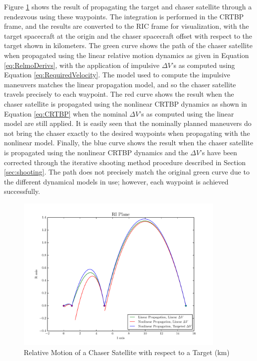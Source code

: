 \documentclass[a4paper]{article}
\begin{document}
Figure \ref{fig:RIC_1} shows the result of propagating the target and chaser satellite through a rendezvous using these waypoints.  The integration is performed in the CRTBP frame, and the results are converted to the RIC frame for visualization, with the target spacecraft at the origin and the chaser spacecraft offset with respect to the target shown in kilometers.  The green curve shows the path of the chaser satellite when propagated using the linear relative motion dynamics as given in Equation \ref{eq:RelmoDerivs}, with the application of impulsive \(\Delta V\)'s as computed using Equation \ref{eq:RequiredVelocity}.  The model used to compute the impulsive maneuvers matches the linear propagation model, and so the chaser satellite travels precisely to each waypoint.  The red curve shows the result when the chaser satellite is propagated using the nonlinear CRTBP dynamics as shown in Equation \ref{eq:CRTBP} when the nominal \(\Delta V\)'s as computed using the linear model are still applied.  It is easily seen that the nominally planned maneuvers do not bring the chaser exactly to the desired waypoints when propagating with the nonlinear model.  Finally, the blue curve shows the result when the chaser satellite is propagated using the nonlinear CRTBP dynamics and the \(\Delta V\)'s have been corrected through the iterative shooting method procedure described in Section \ref{sec:shooting}.  The path does not precisely match the original green curve due to the different dynamical models in use; however, each waypoint is achieved successfully.  %

\begin{figure}[h] 
	\begin{center}
		\includegraphics[width=0.9\textwidth]{RIC_1}
		\caption{Relative Motion of a Chaser Satellite with respect to a Target (km)}
		\label{fig:RIC_1}
	\end{center}
\end{figure} %
\end{document}
